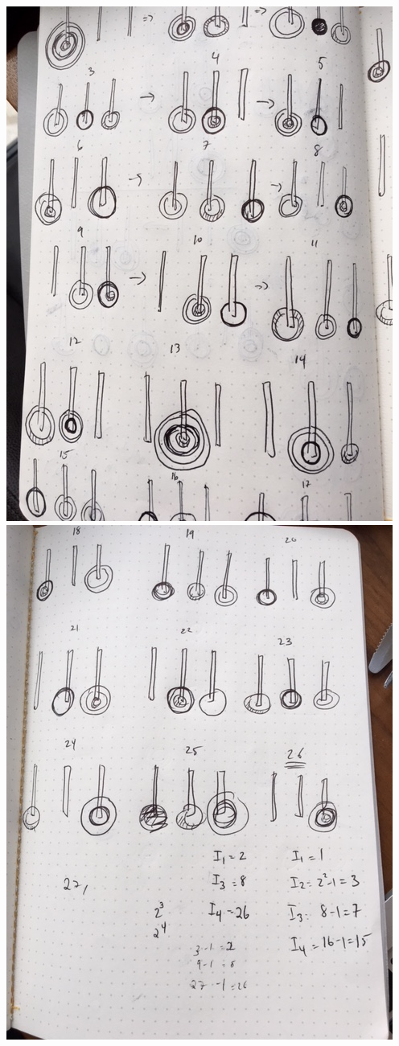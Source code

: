 \documentclass{article}
\begin{document}
\includegraphics[scale=.5]{towers-2} \\
\includegraphics[scale=.5]{towers-3} \\
\end{document}
